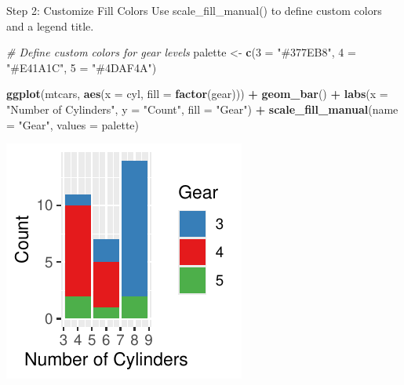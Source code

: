 \documentclass[
  ignorenonframetext,
]{beamer}
\newenvironment{Shaded}{\begin{snugshade}}{\end{snugshade}}
\newcommand{\AttributeTok}[1]{\textcolor[rgb]{0.13,0.29,0.53}{#1}}
\newcommand{\CommentTok}[1]{\textcolor[rgb]{0.56,0.35,0.01}{\textit{#1}}}
\newcommand{\FunctionTok}[1]{\textcolor[rgb]{0.13,0.29,0.53}{\textbf{#1}}}
\newcommand{\NormalTok}[1]{#1}
\newcommand{\OtherTok}[1]{\textcolor[rgb]{0.56,0.35,0.01}{#1}}
\newcommand{\SpecialCharTok}[1]{\textcolor[rgb]{0.81,0.36,0.00}{\textbf{#1}}}
\newcommand{\StringTok}[1]{\textcolor[rgb]{0.31,0.60,0.02}{#1}}
\begin{document}
\begin{frame}[fragile]{Step 2: Customize Fill Colors}
\label{step-2-customize-fill-colors}
Use scale\_fill\_manual() to define custom colors and a legend title.


\begin{Shaded}
\begin{Highlighting}[]
\CommentTok{\# Define custom colors for gear levels}
\NormalTok{palette }\OtherTok{\textless{}{-}} \FunctionTok{c}\NormalTok{(}\StringTok{\textasciigrave{}}\AttributeTok{3}\StringTok{\textasciigrave{}} \OtherTok{=} \StringTok{"\#377EB8"}\NormalTok{, }\StringTok{\textasciigrave{}}\AttributeTok{4}\StringTok{\textasciigrave{}} \OtherTok{=} \StringTok{"\#E41A1C"}\NormalTok{, }\StringTok{\textasciigrave{}}\AttributeTok{5}\StringTok{\textasciigrave{}} \OtherTok{=} \StringTok{"\#4DAF4A"}\NormalTok{)}

\FunctionTok{ggplot}\NormalTok{(mtcars, }\FunctionTok{aes}\NormalTok{(}\AttributeTok{x =}\NormalTok{ cyl, }\AttributeTok{fill =} \FunctionTok{factor}\NormalTok{(gear))) }\SpecialCharTok{+} \FunctionTok{geom\_bar}\NormalTok{() }\SpecialCharTok{+}
    \FunctionTok{labs}\NormalTok{(}\AttributeTok{x =} \StringTok{"Number of Cylinders"}\NormalTok{, }\AttributeTok{y =} \StringTok{"Count"}\NormalTok{, }\AttributeTok{fill =} \StringTok{"Gear"}\NormalTok{) }\SpecialCharTok{+}
    \FunctionTok{scale\_fill\_manual}\NormalTok{(}\AttributeTok{name =} \StringTok{"Gear"}\NormalTok{, }\AttributeTok{values =}\NormalTok{ palette)}
\end{Highlighting}
\end{Shaded}

\begin{center}\includegraphics[width=0.5\linewidth]{Figs/unnamed-chunk-29-1} \end{center}
\end{frame}
\end{document}
